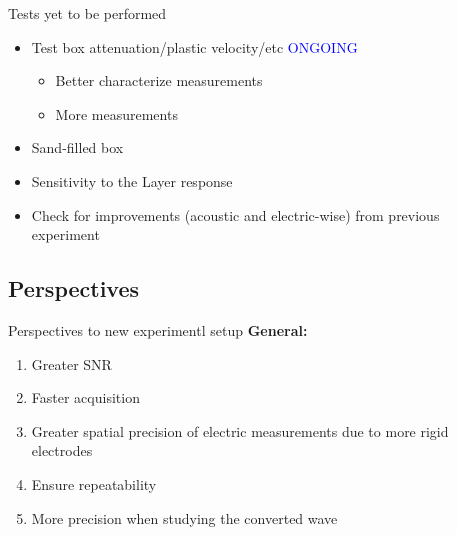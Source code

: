 \documentclass[utf8]{beamer} \usetheme{lfcr} %
\begin{document}
%
\begin{frame}{Tests yet to be performed}
  \begin{itemize}
    \item {Test box attenuation/plastic velocity/etc \textcolor{blue}{ONGOING}
      \begin{itemize}
        \item Better characterize measurements
          \item More measurements
      \end{itemize}
      }
    \item Sand-filled box
    \item Sensitivity to the Layer response
    \item Check for improvements (acoustic and electric-wise) from previous experiment
  \end{itemize}
\end{frame}
%
\subsection{Perspectives}
\begin{frame}{Perspectives to new experimentl setup}
  \textbf{General:}
  \begin{enumerate}
    \item Greater SNR
    \item Faster acquisition
    \item Greater spatial precision of electric measurements due to more rigid
      electrodes
    \item Ensure repeatability
    \item More precision when studying the converted wave
  \end{enumerate}

\end{frame}
%
\end{document}
